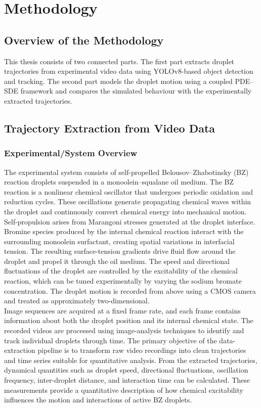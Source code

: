 \chapter{Methodology}

\section{Overview of the Methodology}

This thesis consists of two connected parts. The first part extracts droplet trajectories from experimental video data using YOLOv8-based object detection and tracking. The second part models the droplet motion using a coupled PDE--SDE framework and compares the simulated behaviour with the experimentally extracted trajectories.

\section{Trajectory Extraction from Video Data}
\subsection{Experimental/System Overview}

The experimental system consists of self-propelled Belousov--Zhabotinsky (BZ)\cite{FastMoving2021article,Shajahan2026} reaction droplets suspended in a monoolein--squalane oil medium. The BZ reaction is a nonlinear chemical oscillator that undergoes periodic oxidation and reduction cycles. These oscillations generate propagating chemical waves within the droplet and continuously convert chemical energy into mechanical motion.
Self-propulsion arises from Marangoni stresses\cite{izzet2020,FastMoving2021article} generated at the droplet interface. \\Bromine species produced by the internal chemical reaction interact with the surrounding monoolein surfactant, creating spatial variations in interfacial tension. The resulting surface-tension gradients drive fluid flow around the droplet and propel it through the oil medium. The speed and directional fluctuations of the droplet are controlled by the excitability of the chemical reaction, which can be tuned experimentally by varying the sodium bromate concentration.
The droplet motion is recorded from above using a CMOS camera and treated as approximately two-dimensional.\\ Image sequences are acquired at a fixed frame rate, and each frame contains information about both the droplet position and its internal chemical state. The recorded videos are processed using image-analysis techniques to identify and track individual droplets through time.
The primary objective of the data-extraction pipeline is to transform raw video recordings into clean trajectories and time series suitable for quantitative analysis. From the extracted trajectories, dynamical quantities such as droplet speed, directional fluctuations, oscillation frequency, inter-droplet distance, and interaction time can be calculated. These measurements provide a quantitative description of how chemical excitability influences the motion and interactions of active BZ droplets.
